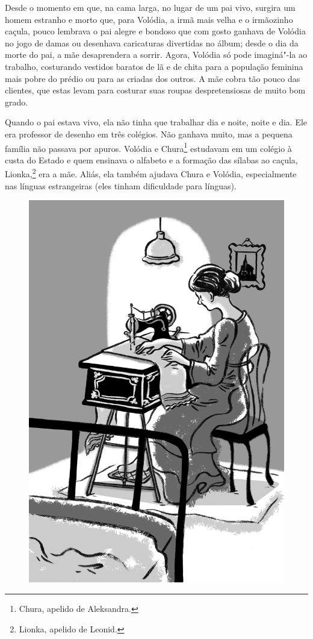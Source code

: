 Desde o momento em que, na cama larga, no lugar de um pai vivo, surgira
um homem estranho e morto que, para Volódia, a irmã mais velha e o
irmãozinho caçula, pouco lembrava o pai alegre e bondoso que com gosto
ganhava de Volódia no jogo de damas ou desenhava caricaturas divertidas
no álbum; desde o dia da morte do pai, a mãe desaprendera a sorrir.
Agora, Volódia só pode imaginá"-la ao trabalho, costurando
vestidos baratos de lã e de chita para a população feminina mais pobre
do prédio ou para as criadas dos outros. A mãe cobra tão pouco das
clientes, que estas levam para costurar suas roupas despretensiosas de
muito bom grado.

Quando o pai estava vivo, ela não tinha que trabalhar dia e noite, noite
e dia. Ele era professor de desenho em três colégios. Não ganhava muito,
mas a pequena família não passava por apuros. Volódia e Chura\footnote{Chura,
  apelido de Aleksandra.} estudavam em um colégio à custa do Estado e
quem ensinava o alfabeto e a formação das sílabas ao caçula,
Lionka,\footnote{Lionka, apelido de Leonid.} era a mãe. Aliás, ela
também ajudava Chura e Volódia, especialmente nas línguas estrangeiras
(eles tinham dificuldade para línguas).

\begin{figure}%
\vspace*{-2cm}
\hspace*{-2.5cm}\includegraphics{./imgs/cena13.jpg}
\end{figure}

